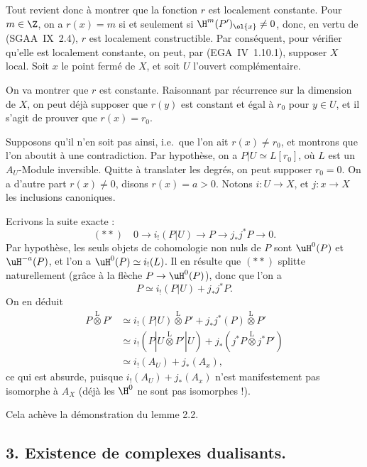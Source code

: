 Tout revient donc à montrer que la fonction $r$ est localement constante. Pour $m \in \Z$, on a $r(x) = m$ si et seulement si $\H^{m}(P')_{\ol{x}} \neq 0$, donc, en vertu de (SGAA~IX~2.4), $r$ est localement constructible. Par conséquent,
pour vérifier qu'elle est localement constante, on peut, par (EGA~IV~1.10.1), supposer $X$ local. Soit $x$ le point fermé de $X$, et soit $U$ l'ouvert complémentaire.

On va montrer que $r$ est constante. Raisonnant par récurrence sur la dimension de $X$, on peut déjà supposer que $r(y)$ est constant et égal à $r_0$ pour $y \in U$, et il s'agit de prouver que $r(x) = r_0$.

Supposons qu'il n'en soit pas ainsi, i.e.~que l'on ait $r(x) \neq r_0$, et montrons que l'on aboutit à une contradiction. Par hypothèse, on a $P|U \simeq L[r_0]$, où $L$ est un $A_U$-Module inversible. Quitte à translater les degrés, on peut supposer $r_0 = 0$. On a d'autre part $r(x) \neq 0$, disons $r(x) = a > 0$. Notons $i : U \to X$, et $j : x \to X$ les inclusions canoniques.

Ecrivons la suite exacte :
\[
(**) \quad 0 \longrightarrow i_{!}(P|U) \longrightarrow P \longrightarrow j_{*}j^{*}P \longrightarrow 0.
\]
Par hypothèse, les seuls objets de cohomologie non nuls de $P$ sont $\uH^{0}(P)$ et $\uH^{-a}(P)$, et l'on a $\uH^{0}(P) \simeq i_{!}(L)$. Il en résulte que $(**)$ splitte naturellement (grâce à la flèche $P \to \uH^{0}(P)$), donc que l'on a
\[
P \simeq i_{!}(P|U) + j_{*}j^{*}P.
\]
On en déduit
\begin{align*}
P \mathop{\otimes}\limits^{\mathrm{L}} P' &\simeq i_{!}(P|U) \mathop{\otimes}\limits^{\mathrm{L}} P' + j_{*}j^{*}(P) \mathop{\otimes}\limits^{\mathrm{L}} P' \\
&\simeq i_{!}(P|U \mathop{\otimes}\limits^{\mathrm{L}} P'|U) + j_{*}(j^{*}P \mathop{\otimes}\limits^{\mathrm{L}} j^{*}P') \\
&\simeq i_{!}(A_U) + j_{*}(A_x),
\end{align*}
ce qui est absurde, puisque $i_{!}(A_U) + j_{*}(A_x)$ n'est manifestement pas isomorphe à $A_X$ (déjà les $\H^{0}$ ne sont pas isomorphes !).

Cela achève la démonstration du lemme 2.2.

\subsection*{3. Existence de complexes dualisants.}

